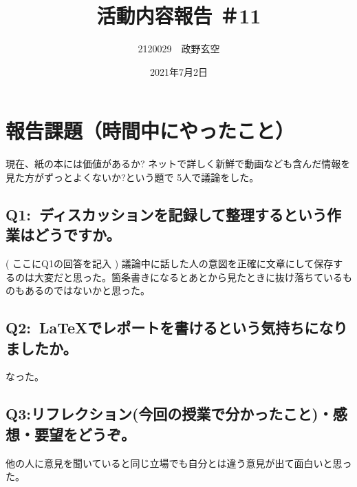 \documentclass[12pt,a4j]{jarticle}
\begin{document}
\title{活動内容報告 ＃11}
\author{2120029　政野玄空}
\date{2021年7月2日}
\maketitle

\section{報告課題（時間中にやったこと）}
現在、紙の本には価値があるか? ネットで詳しく新鮮で動画なども含んだ情報を見た方がずっとよくないか?という題で
5人で議論をした。



\subsection{Q1:~ディスカッションを記録して整理するという作業はどうですか。}
( ここにQ1の回答を記入 )
議論中に話した人の意図を正確に文章にして保存するのは大変だと思った。箇条書きになるとあとから見たときに抜け落ちているものもあるのではないかと思った。
\subsection{Q2:~LaTeXでレポートを書けるという気持ちになりましたか。}
なった。

\subsection{Q3:リフレクション(今回の授業で分かったこと)・感想・要望をどうぞ。}
他の人に意見を聞いていると同じ立場でも自分とは違う意見が出て面白いと思った。
\end{document}
